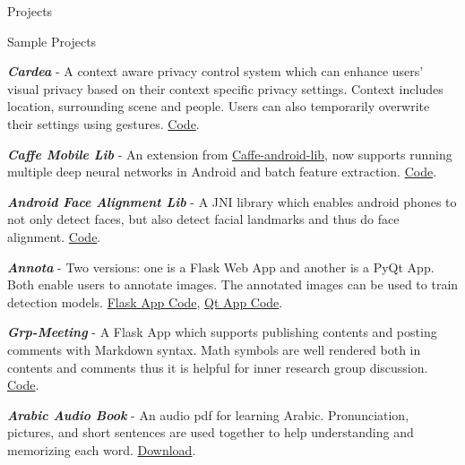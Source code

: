 \documentclass{resume} %
\begin{document}

\newpage

\begin{rSection}{Projects}

\begin{rSubsection}{Sample Projects}{}{}{}

\item {\bf\em Cardea} - A context aware privacy control system which can enhance users' visual privacy based on their context specific privacy settings. Context includes location, surrounding scene and people. Users can also temporarily overwrite their settings using gestures. \href{https://github.com/ZhengRui/cardea}{Code}.

\item {\bf\em Caffe Mobile Lib} - An extension from \href{https://github.com/sh1r0/caffe-android-lib}{Caffe-android-lib}, now supports running multiple deep neural networks in Android and batch feature extraction. \href{https://github.com/ZhengRui/caffe-android-lib}{Code}.

\item {\bf\em Android Face Alignment Lib} - A JNI library which enables android phones to not only detect faces, but also detect facial landmarks and thus do face alignment. \href{https://github.com/ZhengRui/FaceAlignmentJNI}{Code}.

\item {\bf\em Annota} - Two versions: one is a Flask Web App and another is a PyQt App. Both enable users to annotate images. The annotated images can be used to train detection models. \href{https://github.com/ZhengRui/ImgAnnotaWeb}{Flask App Code}, \href{https://github.com/ZhengRui/ImgAnnotaPyQt4}{Qt App Code}.

\item {\bf\em Grp-Meeting} - A Flask App which supports publishing contents and posting comments with Markdown syntax. Math symbols are well rendered both in contents and comments thus it is helpful for inner research group discussion. \href{https://github.com/ZhengRui/grpmeeting}{Code}.

\item {\bf\em Arabic Audio Book} - An audio pdf for learning Arabic. Pronunciation, pictures, and short sentences are used together to help understanding and memorizing each word. \href{http://bit.ly/28Qbqj2}{Download}.


\end{rSubsection}
\end{rSection}
\end{document}
